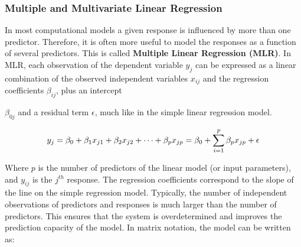 \documentclass[12pt]{article}
\begin{document}

\subsubsection{Multiple and Multivariate Linear Regression} \label{sec:MLR}

In most computational models a given response is influenced by more than one predictor. Therefore, it is often more useful to model the responses as a function of several predictors. This is called \textbf{Multiple Linear Regression (MLR)}. In MLR, each observation of the dependent variable $y_{j}$ can be expressed as a linear combination of the observed independent variables $x_{ij}$ and the regression coefficients $\beta_{ij}$, plus an intercept {$\beta_{0j}$ and a residual term $\epsilon$, much like in the simple linear regression model.
	
	\begin{equation}
	y_{j}  = \beta_{0} + \beta_{1}x_{j1}+\beta_{2}x_{j2}+\dots + \beta_{p}x_{jp} = \beta_{0} + \sum^{p}_{i=1} \beta_{p}x_{jp} + \epsilon\\
	\end{equation}

Where $p$ is the number of predictors of the linear model (or input parameters), and $y_{ij}$ is the $j^{th}$ response. %
The regression coefficients correspond to the slope of the line on the simple regression model. Typically, the number of independent observations of predictors and responses is much larger than the number of predictors. This ensures that the system is overdetermined and improves the prediction capacity of the model. 
In matrix notation, the model can be written as:

}
\end{document}
